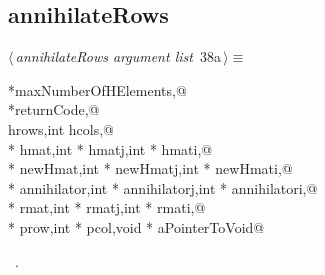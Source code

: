\documentclass{article}
\begin{document}
\begin{flushleft}
\begin{minipage}{\linewidth}
\begin{list}{}{\setlength{\itemsep}{-\parsep}\setlength{\itemindent}{-\leftmargin}}
\item{}
\end{list}
\end{minipage}\vspace{4ex}
\end{flushleft}
\subsection{annihilateRows}
\label{sec:annihilateRows}

\begin{flushleft} \small
\begin{minipage}{\linewidth}\label{scrap47}\raggedright\small
{} $\langle\,${\itshape annihilateRows argument list}\nobreak\ {\footnotesize {38a}}$\,\rangle\equiv$
\vspace{-1ex}
\begin{list}{}{} \item
\mbox{}\verb@int *maxNumberOfHElements,@\\
\mbox{}\verb@int *returnCode,@\\
\mbox{}\verb@int hrows,int hcols,@\\
\mbox{}\verb@double * hmat,int * hmatj,int * hmati,@\\
\mbox{}\verb@double * newHmat,int * newHmatj,int * newHmati,@\\
\mbox{}\verb@double * annihilator,int * annihilatorj,int * annihilatori,@\\
\mbox{}\verb@double * rmat,int * rmatj,int * rmati,@\\
\mbox{}\verb@int * prow,int * pcol,void * aPointerToVoid@\\
\mbox{}\verb@@{\NWsep}
\end{list}
\vspace{-1.5ex}
\footnotesize
\begin{list}{}{\setlength{\itemsep}{-\parsep}\setlength{\itemindent}{-\leftmargin}}
\item \NWtxtMacroRefIn\ .

\end{list}
\end{minipage}
\end{flushleft}
\end{document}
